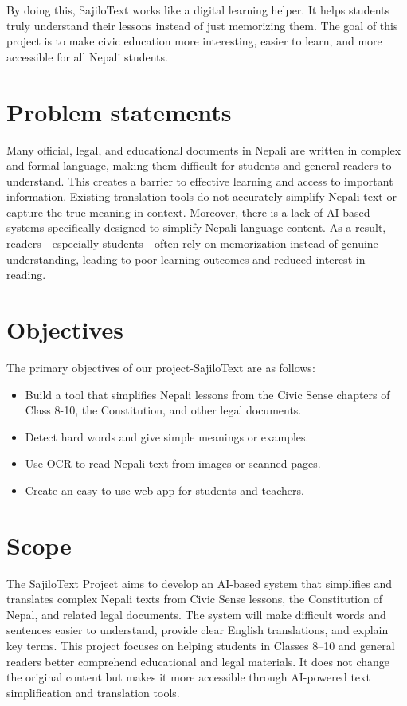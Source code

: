 \documentclass[12pt]{report}
\begin{document}
By doing this, SajiloText works like a digital learning helper. It helps students truly understand their lessons instead of just memorizing them. The goal of this project is to make civic education more interesting, easier to learn, and more accessible for all Nepali students.
\section{Problem statements}
Many official, legal, and educational documents in Nepali are written in complex and formal language, making them difficult for students and general readers to understand. This creates a barrier to effective learning and access to important information. Existing translation tools do not accurately simplify Nepali text or capture the true meaning in context. Moreover, there is a lack of AI-based systems specifically designed to simplify Nepali language content. As a result, readers—especially students—often rely on memorization instead of genuine understanding, leading to poor learning outcomes and reduced interest in reading.
\section{Objectives}
 The primary objectives of our project-SajiloText are as follows:
\begin{itemize}
\item Build a tool that simplifies Nepali lessons from the Civic Sense chapters of Class 8-10, the Constitution, and other legal documents.

\item Detect hard words and give simple meanings or examples.
\item Use OCR to read Nepali text from images or scanned pages.
\item Create an easy-to-use web app for students and teachers.
\end{itemize}
\section{Scope}
The SajiloText Project aims to develop an AI-based system that simplifies and translates complex Nepali texts from Civic Sense lessons, the Constitution of Nepal, and related legal documents. The system will make difficult words and sentences easier to understand, provide clear English translations, and explain key terms. This project focuses on helping students in Classes 8–10 and general readers better comprehend educational and legal materials. It does not change the original content but makes it more accessible through AI-powered text simplification and translation tools.
\end{document}
